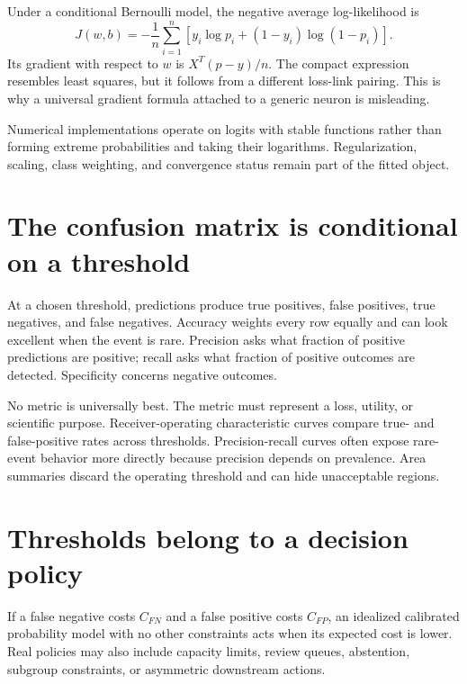 Under a conditional Bernoulli model, the negative average log-likelihood is
\[
J(w,b)=-\frac{1}{n}\sum_{i=1}^n
\left[y_i\log p_i+(1-y_i)\log(1-p_i)\right].
\]
Its gradient with respect to $w$ is $X^T(p-y)/n$. The compact expression
resembles least squares, but it follows from a different loss-link pairing.
This is why a universal gradient formula attached to a generic neuron is
misleading.

Numerical implementations operate on logits with stable functions rather than
forming extreme probabilities and taking their logarithms. Regularization,
scaling, class weighting, and convergence status remain part of the fitted
object.


\section{The confusion matrix is conditional on a threshold}

At a chosen threshold, predictions produce true positives, false positives,
true negatives, and false negatives. Accuracy weights every row equally and can
look excellent when the event is rare. Precision asks what fraction of positive
predictions are positive; recall asks what fraction of positive outcomes are
detected. Specificity concerns negative outcomes.

No metric is universally best. The metric must represent a loss, utility, or
scientific purpose. Receiver-operating characteristic curves compare true- and
false-positive rates across thresholds. Precision-recall curves often expose
rare-event behavior more directly because precision depends on prevalence.
Area summaries discard the operating threshold and can hide unacceptable
regions.

\section{Thresholds belong to a decision policy}

If a false negative costs $C_{FN}$ and a false positive costs $C_{FP}$, an
idealized calibrated probability model with no other constraints acts when its
expected cost is lower. Real policies may also include capacity limits, review
queues, abstention, subgroup constraints, or asymmetric downstream actions.

